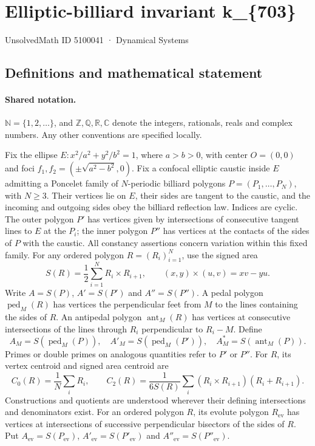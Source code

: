 \documentclass[11pt]{article}
\begin{document}
\setcounter{section}{5100040}
\section{Elliptic-billiard invariant k\_\{703\}}\label{5100041}
{\small\sffamily UnsolvedMath ID 5100041 · Dynamical Systems}
\subsection{Definitions and mathematical statement}

\paragraph{Shared notation.}$\mathbb N=\{1,2,\ldots\}$, and $\mathbb Z,\mathbb Q,\mathbb R,\mathbb C$ denote the integers, rationals, reals and complex numbers. Any other conventions are specified locally.


Fix the ellipse $E:x^2/a^2+y^2/b^2=1$, where $a>b>0$, with center $O=(0,0)$ and foci $f_1,f_2=(\pm\sqrt{a^2-b^2},0)$. Fix a confocal elliptic caustic inside $E$ admitting a Poncelet family of $N$-periodic billiard polygons $P=(P_1,\ldots,P_N)$, with $N\geq3$. Their vertices lie on $E$, their sides are tangent to the caustic, and the incoming and outgoing sides obey the billiard reflection law. Indices are cyclic. The outer polygon $P'$ has vertices given by intersections of consecutive tangent lines to $E$ at the $P_i$; the inner polygon $P''$ has vertices at the contacts of the sides of $P$ with the caustic. All constancy assertions concern variation within this fixed family.
For any ordered polygon $R=(R_i)_{i=1}^N$, use the signed area
\[S(R)=\frac12\sum_{i=1}^N R_i\times R_{i+1},\qquad (x,y)\times(u,v)=xv-yu.\]
Write $A=S(P)$, $A'=S(P')$ and $A''=S(P'')$. A pedal polygon $\operatorname{ped}_M(R)$ has vertices the perpendicular feet from $M$ to the lines containing the sides of $R$. An antipedal polygon $\operatorname{ant}_M(R)$ has vertices at consecutive intersections of the lines through $R_i$ perpendicular to $R_i-M$. Define
\[A_M=S(\operatorname{ped}_M(P)),\quad A'_M=S(\operatorname{ped}_M(P')),\quad A_M^*=S(\operatorname{ant}_M(P)).\]
Primes or double primes on analogous quantities refer to $P'$ or $P''$. For $R$, its vertex centroid and signed area centroid are
\[C_0(R)=\frac1N\sum_i R_i,\qquad C_2(R)=\frac{1}{6S(R)}\sum_i(R_i\times R_{i+1})(R_i+R_{i+1}).\]
Constructions and quotients are understood wherever their defining intersections and denominators exist.
For an ordered polygon $R$, its evolute polygon $R_{\mathrm{ev}}$ has vertices at intersections of successive perpendicular bisectors of the sides of $R$. Put $A_{\mathrm{ev}}=S(P_{\mathrm{ev}})$, $A'_{\mathrm{ev}}=S(P'_{\mathrm{ev}})$ and $A''_{\mathrm{ev}}=S(P''_{\mathrm{ev}})$.
\end{document}
